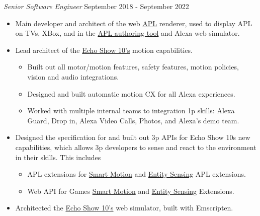 \documentclass[a4paper]{article}
\begin{document}
\begin{addmargin}[1em]{0em}
    \textit{Senior Software Engineer} \hfill September 2018 - September 2022\\
    \vspace{-1mm}
    \begin{itemize} \itemsep 1pt
        \item Main developer and architect of the web \href{https://developer.amazon.com/en-US/docs/alexa/alexa-presentation-language/understand-apl.html}{APL} renderer, 
            used to display APL on TVs, XBox, and in the \href{https://developer.amazon.com/alexa/console/ask/displays}{APL authoring tool} and Alexa web simulator.
        \item Lead architect of the \href{https://www.amazon.com/dp/B07VHZ41L8/}{Echo Show 10's} motion capabilities.
        \begin{itemize}
            \item Built out all motor/motion features, safety features, motion policies, vision and audio integrations.
            \item Designed and built automatic motion CX for all Alexa experiences.
            \item Worked with multiple internal teams to integration 1p skills: Alexa Guard, Drop in, Alexa Video Calls, Photos, and Alexa's demo team.
        \end{itemize}
        \item Designed the specification for and built out 3p APIs for Echo Show 10s new capabilities, which allows
            3p developers to sense and react to the environment in their skills. This includes
        \begin{itemize}
            \item APL extensions for \href{https://developer.amazon.com/de-DE/docs/alexa/alexa-presentation-language/apl-ext-smart-motion.html}{Smart Motion} 
                and \href{https://developer.amazon.com/de-DE/docs/alexa/alexa-presentation-language/apl-ext-entity-sensing.html}{Entity Sensing} APL extensions.
            \item Web API for Games \href{https://developer.amazon.com/en-US/docs/alexa/web-api-for-games/alexa-games-extensions-smartmotion.html}{Smart Motion}
                and \href{https://developer.amazon.com/en-US/docs/alexa/web-api-for-games/alexa-games-extensions-entitysensing.html}{Entity Sensing} Extensions.
        \end{itemize}
        \item Architected the \href{https://developer.amazon.com/en-US/docs/alexa/alexa-presentation-language/test-apl-skills-dev-console.html#use-the-smart-motion-simulator}{Echo Show 10's} 
            web simulator, built with Emscripten.
    \end{itemize}

\end{addmargin}
\end{document}
